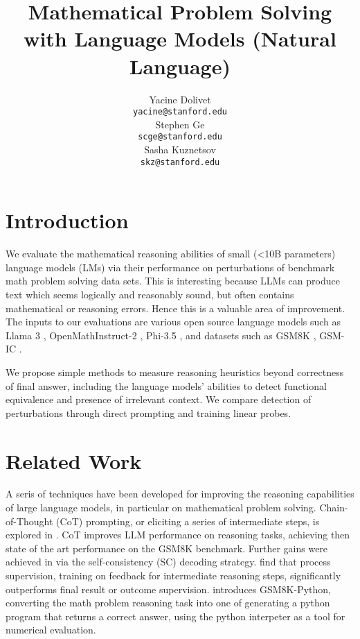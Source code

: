 \documentclass{article}
\title{Mathematical Problem Solving with Language Models (Natural Language)
}
\author{
  Yacine Dolivet\\
  \texttt{yacine@stanford.edu} \\
  \And
  Stephen Ge\\
  \texttt{scge@stanford.edu} \\
   \And
  Sasha Kuznetsov\\
  \texttt{skz@stanford.edu} \\
}
\begin{document}
\maketitle




\section{Introduction}
We evaluate the mathematical reasoning abilities of small (<10B parameters) language models (LMs) via their performance on perturbations of benchmark math problem solving data sets. This is interesting because LLMs can produce text which seems logically and reasonably sound, but often contains mathematical or reasoning errors. Hence this is a valuable area of improvement. The inputs to our evaluations are various open source language models such as Llama 3 \citep{dubey}, OpenMathInstruct-2 \citep{toshniwal}, Phi-3.5 \citep{abdin}, and datasets such as GSM8K \citep{cobbe}, GSM-IC \citep{shi}.

We propose simple methods to measure reasoning heuristics beyond correctness of final answer, including the language models' abilities to detect functional equivalence and presence of irrelevant context. We compare detection of perturbations through direct prompting and training linear probes.

\section{Related Work}
A seris of techniques have been developed for improving the reasoning capabilities of large language models, in particular on mathematical problem solving. Chain-of-Thought (CoT) prompting, or eliciting a series of intermediate steps, is explored in \citep{wei}. CoT improves LLM performance on reasoning tasks, achieving then state of the art performance on the GSM8K benchmark. Further gains were achieved in \citep{wang} via the self-consistency (SC) decoding strategy. \citep{lightman} find that process supervision, training on feedback for intermediate reasoning steps, significantly outperforms final result or outcome supervision. \citep{chowdhery} introduces GSM8K-Python, converting the math problem reasoning task into one of generating a python program that returns a correct answer, using the python interpeter as a tool for numerical evaluation.
\end{document}
